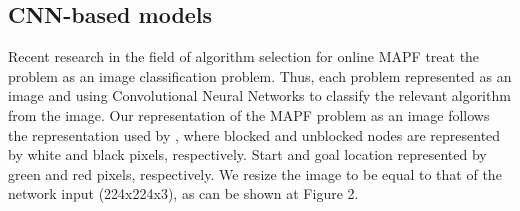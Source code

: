\documentclass[letterpaper]{article} %
\begin{document}
\subsection{CNN-based models}
Recent research in the field of algorithm selection for online MAPF treat the problem as an image classification problem. Thus, each problem represented as an image and using Convolutional Neural Networks to classify the relevant algorithm from the image.
Our representation of the MAPF problem as an image follows the representation used by \cite{sigurdson2019deep}, where blocked and unblocked nodes are represented by white and black pixels, respectively. Start and goal location represented by green and red pixels, respectively.
We resize the image to be equal to that of the network input (224x224x3), as can be shown at Figure 2.
\end{document}
